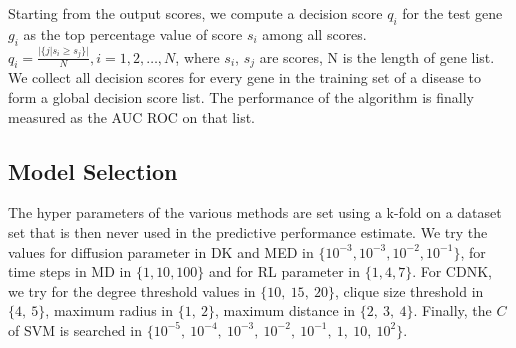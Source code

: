 \documentclass{esannV2}
\begin{document}
Starting from the output scores, we compute a decision score $q_i$ for the
test gene $g_i$ as the top percentage value of score $s_i$ among all scores.
$q_{i} = \frac{\vert \{j\vert s_{i} \geq s_{j} \rbrace \vert}{N}, i =
1,2,\ldots,N$, where $s_i$, $s_j$ are scores, N is the length of gene list. We
collect all decision scores for every gene in the training set of a disease to
form a global decision score list. The performance of the algorithm is finally
measured as the AUC ROC on that list.

\subsection{Model Selection}

The hyper parameters of the various methods are set using a k-fold on a
dataset set that is then never used in the predictive performance estimate. We
try the values for diffusion parameter in DK and MED in $\lbrace 10^{-3},
10^{-3}, 10^{-2}, 10^{-1} \rbrace$, for time steps in MD in $\lbrace 1, 10,
100 \rbrace$ and for RL parameter in $\lbrace 1, 4, 7 \rbrace$. For CDNK, we
try for the degree threshold values in $\lbrace 10,\ 15,\ 20 \rbrace$, clique size
threshold in $\lbrace 4,\ 5 \rbrace$, maximum radius in $\lbrace 1,\ 2
\rbrace$, maximum distance in $\lbrace 2,\ 3,\ 4 \rbrace$. Finally, the $C$ of
SVM is searched in $\lbrace 10^{-5},  \ 10^{-4}, \ 10^{-3},\ 10^{-2},\ 10^{-1},\
1,\ 10,\ 10^2 \rbrace$.
\end{document}

